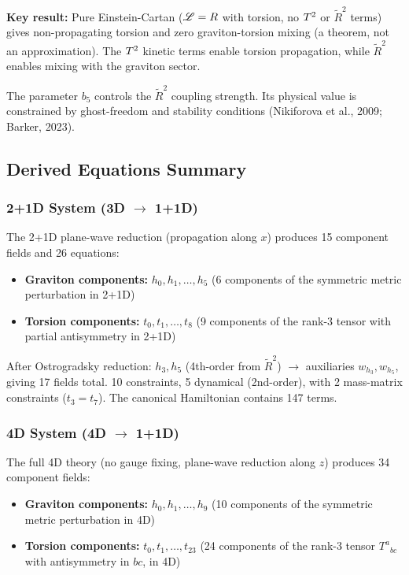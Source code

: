 \textbf{Key result:} Pure Einstein-Cartan ($\mathscr{L} = R$ with torsion, no $T^2$ or $\tilde{R}^2$ terms) gives non-propagating torsion and zero graviton-torsion mixing (a theorem, not an approximation). The $T^2$ kinetic terms enable torsion propagation, while $\tilde{R}^2$ enables mixing with the graviton sector.

The parameter $b_5$ controls the $\tilde{R}^2$ coupling strength. Its physical value is constrained by ghost-freedom and stability conditions (Nikiforova et al., 2009; Barker, 2023).

\subsection{Derived Equations Summary}
\label{sec:torsion-derived-equations}

\subsubsection{2+1D System (3D $\to$ 1+1D)}

The 2+1D plane-wave reduction (propagation along $x$) produces 15 component fields and 26 equations:

\begin{itemize}
  \item \textbf{Graviton components:} $h_0, h_1, \ldots, h_5$ (6 components of the symmetric metric perturbation in 2+1D)
  \item \textbf{Torsion components:} $t_0, t_1, \ldots, t_8$ (9 components of the rank-3 tensor with partial antisymmetry in 2+1D)
\end{itemize}

After Ostrogradsky reduction: $h_3, h_5$ (4th-order from $\tilde{R}^2$) $\to$ auxiliaries $w_{h_3}, w_{h_5}$, giving 17 fields total.  10 constraints, 5 dynamical (2nd-order), with 2 mass-matrix constraints ($t_3 = t_7$).  The canonical Hamiltonian contains 147 terms.

\subsubsection{4D System (4D $\to$ 1+1D)}
\label{sec:torsion-4d}

The full 4D theory (no gauge fixing, plane-wave reduction along $z$) produces 34 component fields:

\begin{itemize}
  \item \textbf{Graviton components:} $h_0, h_1, \ldots, h_9$ (10 components of the symmetric metric perturbation in 4D)
  \item \textbf{Torsion components:} $t_0, t_1, \ldots, t_{23}$ (24 components of the rank-3 tensor $T^a{}_{bc}$ with antisymmetry in $bc$, in 4D)
\end{itemize}


